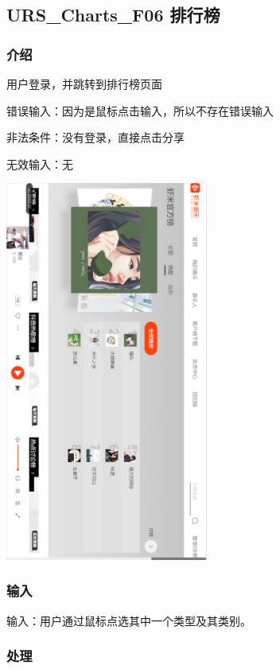    \subsection{URS\_Charts\_F06 排行榜}

   \subsubsection{介绍}
   
   用户登录，并跳转到排行榜页面
   
   错误输入：因为是鼠标点击输入，所以不存在错误输入
   
   非法条件：没有登录，直接点击分享
   
   无效输入：无
   \begin{center} 
	\begin{sideways}
	\includegraphics[width=0.5\textwidth]{./figures/capture9.png} 
	\end{sideways}
	\end{center}
   \subsubsection{输入}
   
   输入：用户通过鼠标点选其中一个类型及其类别。
   
   
   \subsubsection{处理}
   
